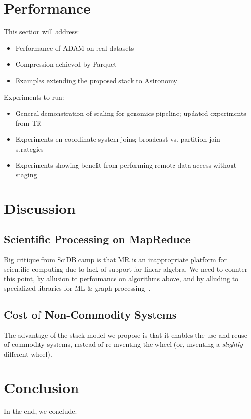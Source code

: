 \documentclass{acm_proc_article-sp}
\begin{document}
\section{Performance}
\label{sec:performance}

This section will address:

\begin{itemize}
\item Performance of ADAM on real datasets
\item Compression achieved by Parquet
\item Examples extending the proposed stack to Astronomy
\end{itemize}

Experiments to run:

\begin{itemize}
\item General demonstration of scaling for genomics pipeline; updated experiments from TR
\item Experiments on coordinate system joins; broadcast vs. partition join strategies
\item Experiments showing benefit from performing remote data access without staging
\end{itemize}

\section{Discussion}
\label{sec:discussion}

\subsection{Scientific Processing on MapReduce}
\label{sec:scientific-compute-mr}

Big critique from SciDB camp is that MR is an inappropriate platform for scientific computing due to
lack of support for linear algebra. We need to counter this point, by allusion to performance on
algorithms above, and by alluding to specialized libraries for ML \& graph
processing~\cite{sparks13, xin13}.

\subsection{Cost of Non-Commodity Systems}
\label{sec:commodity}

The advantage of the stack model we propose is that it enables the use and reuse of commodity
systems, instead of re-inventing the wheel (or, inventing a \emph{slightly} different wheel).

\section{Conclusion}
\label{sec:conclusion}

In the end, we conclude.

\appendix


 

\end{document}
